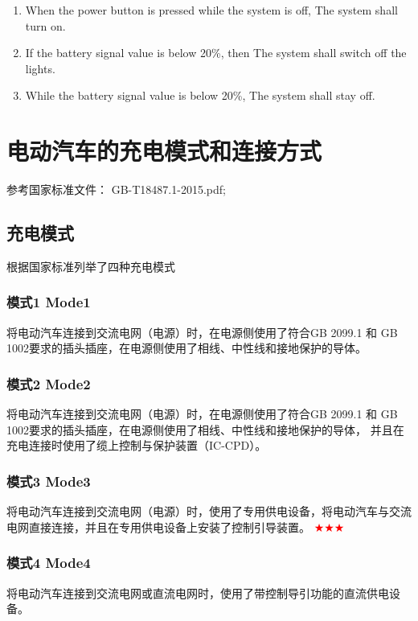 	\begin{enumerate}
		\item \textcolor{winered}{When the power button is pressed while the system is off}, \textcolor{mybule}{The system} \textcolor{mypurple}{shall} \textcolor{mygreen1}{turn on}.
		\item \textcolor{winered}{If the battery signal value is below 20\%}, then \textcolor{mybule}{The system} \textcolor{mypurple}{shall}  \textcolor{mygreen1}{switch off} \textcolor{mygreen2}{the lights}.
		\item \textcolor{winered}{While the battery signal value is below 20\%}, \textcolor{mybule}{The system} \textcolor{mypurple}{shall} \textcolor{mygreen1}{stay off}.
	\end{enumerate}


\section{电动汽车的充电模式和连接方式}
	参考国家标准文件： GB-T18487.1-2015.pdf\cite{GB18487_1};
	\subsection{充电模式}
		根据国家标准列举了四种充电模式
		\subsubsection*{模式1 Mode1}
			将电动汽车连接到交流电网（电源）时，在电源侧使用了符合GB 2099.1 和 GB 1002要求的插头插座，在电源侧使用了相线、中性线和接地保护的导体。
		\subsubsection*{模式2 Mode2}
			将电动汽车连接到交流电网（电源）时，在电源侧使用了符合GB 2099.1 和 GB 1002要求的插头插座，在电源侧使用了相线、中性线和接地保护的导体，
			并且在充电连接时使用了缆上控制与保护装置（IC-CPD）。
		\subsubsection*{模式3 Mode3}
			将电动汽车连接到交流电网（电源）时，使用了专用供电设备，将电动汽车与交流电网直接连接，并且在专用供电设备上安装了控制引导装置。 \textcolor{red}{$\bigstar  \bigstar \bigstar $}
		\subsubsection*{模式4 Mode4}
			将电动汽车连接到交流电网或直流电网时，使用了带控制导引功能的直流供电设备。 

